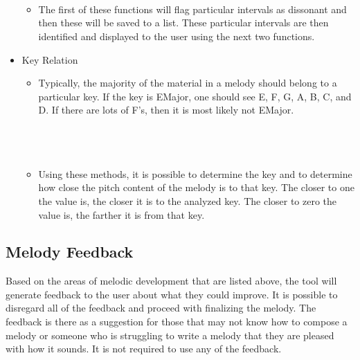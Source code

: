 \begin{itemize}
\begin{itemize}
		 \\
		 \\
		 \\
		\item The first of these functions will flag particular intervals as dissonant and then these will be saved to a list.  These particular intervals are then identified and displayed to the user using the next two functions.
	\end{itemize}
	\item Key Relation
	\begin{itemize}
		\item Typically, the majority of the material in a melody should belong to a particular key.  If the key is E\fl Major, one should see E\fl , F, G, A\fl , B\fl , C, and D.  If there are lots of F\sh 's, then it is most likely not E\fl Major.  \\ \\
		 \\
		 \\
		\item Using these methods, it is possible to determine the key and to determine how close the pitch content of the melody is to that key.  The closer to one the value is, the closer it is to the analyzed key.  The closer to zero the value is, the farther it is from that key.
	\end{itemize}
\end{itemize}

\subsection{Melody Feedback}
\label{subsec:melodyfeedback}

Based on the areas of melodic development that are listed above, the tool will generate feedback to the user about what they could improve.  It is possible to disregard all of the feedback and proceed with finalizing the melody.  The feedback is there as a suggestion for those that may not know how to compose a melody or someone who is struggling to write a melody that they are pleased with how it sounds.  It is not required to use any of the feedback.

\vspace{\baselineskip}

